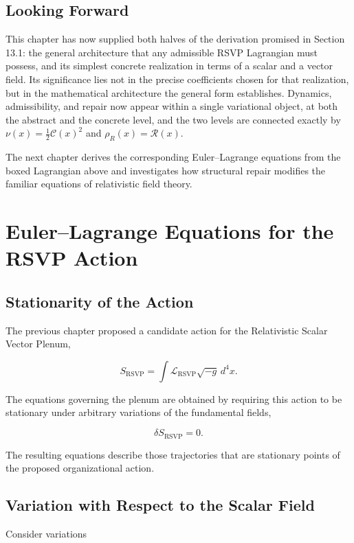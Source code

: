 \documentclass[11pt,oneside]{book}
\numberwithin{equation}{chapter}
\theoremstyle{definition}
\theoremstyle{plain}
\begin{document}
\section{Looking Forward}

This chapter has now supplied both halves of the derivation promised in
Section 13.1: the general architecture that any admissible RSVP Lagrangian
must possess, and its simplest concrete realization in terms of a scalar and
a vector field. Its significance lies not in the precise coefficients
chosen for that realization, but in the mathematical architecture the
general form establishes. Dynamics, admissibility, and repair now appear
within a single variational object, at both the abstract and the concrete
level, and the two levels are connected exactly by \(\nu(x)=\tfrac12\mathcal
C(x)^2\) and \(\rho_R(x)=\mathcal R(x)\).

The next chapter derives the corresponding Euler--Lagrange equations from
the boxed Lagrangian above and investigates how structural repair modifies
the familiar equations of relativistic field theory.

\chapter{Euler--Lagrange Equations for the RSVP Action}

\section{Stationarity of the Action}

The previous chapter proposed a candidate action for the Relativistic Scalar
Vector Plenum,

\[
S_{\mathrm{RSVP}}
=
\int
\mathcal L_{\mathrm{RSVP}}
\sqrt{-g}\,d^4x.
\]

The equations governing the plenum are obtained by requiring this action to
be stationary under arbitrary variations of the fundamental fields,

\[
\delta S_{\mathrm{RSVP}}=0.
\]

The resulting equations describe those trajectories that are stationary
points of the proposed organizational action.

\section{Variation with Respect to the Scalar Field}

Consider variations
\end{document}
